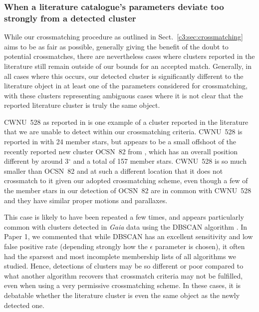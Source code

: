 \subsubsection{When a literature catalogue's parameters deviate too strongly from a detected cluster}\label{c3:sec:discussion-undetected:methodological-reasons:4-literature-error}

While our crossmatching procedure as outlined in Sect.~\ref{c3:sec:crossmatching} aims to be as fair as possible, generally giving the benefit of the doubt to potential crossmatches, there are nevertheless cases where clusters reported in the literature still remain outside of our bounds for an accepted match. Generally, in all cases where this occurs, our detected cluster is significantly different to the literature object in at least one of the parameters considered for crossmatching, with these clusters representing ambiguous cases where it is not clear that the reported literature cluster is truly the same object.

CWNU~528 as reported in \cite{he_new_2022} is one example of a cluster reported in the literature that we are unable to detect within our crossmatching criteria. CWNU~528 is reported in \cite{he_new_2022} with 24 member stars, but appears to be a small offshoot of the recently reported new cluster OCSN~82 from \cite{qin_hunting_2023}, which has an overall position different by around 3$^\circ$ and a total of 157 member stars. CWNU~528 is so much smaller than OCSN~82 and at such a different location that it does not crossmatch to it given our adopted crossmatching scheme, even though a few of the member stars in our detection of OCSN~82 are in common with CWNU~528 and they have similar proper motions and parallaxes.

This case is likely to have been repeated a few times, and appears particularly common with clusters detected in \emph{Gaia} data using the DBSCAN algorithm \citep[as in][]{he_new_2022}. In Paper 1, we commented that while DBSCAN has an excellent sensitivity and low false positive rate (depending strongly how the $\epsilon$ parameter is chosen), it often had the sparsest and most incomplete membership lists of all algorithms we studied. Hence, detections of clusters may be so different or poor compared to what another algorithm recovers that crossmatch criteria may not be fulfilled, even when using a very permissive crossmatching scheme. In these cases, it is debatable whether the literature cluster is even the same object as the newly detected one.

